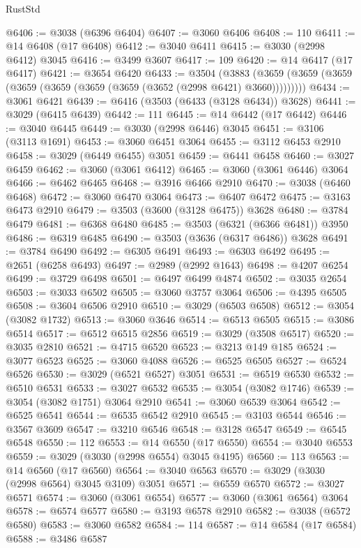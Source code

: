 \begin{lexlean}{RustStd}
\begin{coremodule}
@6406 := @3038 (@6396 @6404)
@6407 := @3060 @6406
@6408 := 110
@6411 := @14 @6408 (@17 @6408)
@6412 := @3040 @6411
@6415 := @3030 (@2998 @6412) @3045
@6416 := @3499 @3607
@6417 := 109
@6420 := @14 @6417 (@17 @6417)
@6421 := @3654 @6420
@6433 := @3504
    (@3883 (@3659 (@3659 (@3659 (@3659 (@3659 (@3659 (@3659 (@3652 (@2998 @6421) @3660)))))))))
@6434 := @3061 @6421
@6439 := @6416 (@3503 (@6433 (@3128 @6434)) @3628)
@6441 := @3029 (@6415 @6439)
@6442 := 111
@6445 := @14 @6442 (@17 @6442)
@6446 := @3040 @6445
@6449 := @3030 (@2998 @6446) @3045
@6451 := @3106 (@3113 @1691)
@6453 := @3060 @6451 @3064
@6455 := @3112 @6453 @2910
@6458 := @3029 (@6449 @6455) @3051
@6459 := @6441 @6458
@6460 := @3027 @6459
@6462 := @3060 (@3061 @6412)
@6465 := @3060 (@3061 @6446) @3064
@6466 := @6462 @6465
@6468 := @3916 @6466 @2910
@6470 := @3038 (@6460 @6468)
@6472 := @3060 @6470 @3064
@6473 := @6407 @6472
@6475 := @3163 @6473 @2910
@6479 := @3503 (@3600 (@3128 @6475)) @3628
@6480 := @3784 @6479
@6481 := @6368 @6480
@6485 := @3503 (@6321 (@6366 @6481)) @3950
@6486 := @6319 @6485
@6490 := @3503 (@3636 (@6317 @6486)) @3628
@6491 := @3784 @6490
@6492 := @6305 @6491
@6493 := @6303 @6492
@6495 := @2651 (@6258 @6493)
@6497 := @2989 (@2992 @1643)
@6498 := @4207 @6254
@6499 := @3729 @6498
@6501 := @6497 @6499 @4874
@6502 := @3035 @2654
@6503 := @3033 @6502
@6505 := @3060 @3757 @3064
@6506 := @4395 @6505
@6508 := @3604 @6506 @2910
@6510 := @3029 (@6503 @6508)
@6512 := @3054 (@3082 @1732)
@6513 := @3060 @3646
@6514 := @6513 @6505
@6515 := @3086 @6514
@6517 := @6512 @6515 @2856
@6519 := @3029 (@3508 @6517)
@6520 := @3035 @2810
@6521 := @4715 @6520
@6523 := @3213 @149 @185
@6524 := @3077 @6523
@6525 := @3060 @4088
@6526 := @6525 @6505
@6527 := @6524 @6526
@6530 := @3029 (@6521 @6527) @3051
@6531 := @6519 @6530
@6532 := @6510 @6531
@6533 := @3027 @6532
@6535 := @3054 (@3082 @1746)
@6539 := @3054 (@3082 @1751) @3064 @2910
@6541 := @3060 @6539 @3064
@6542 := @6525 @6541
@6544 := @6535 @6542 @2910
@6545 := @3103 @6544
@6546 := @3567 @3609
@6547 := @3210 @6546
@6548 := @3128 @6547
@6549 := @6545 @6548
@6550 := 112
@6553 := @14 @6550 (@17 @6550)
@6554 := @3040 @6553
@6559 := @3029 (@3030 (@2998 @6554) @3045 @4195)
@6560 := 113
@6563 := @14 @6560 (@17 @6560)
@6564 := @3040 @6563
@6570 := @3029 (@3030 (@2998 @6564) @3045 @3109) @3051
@6571 := @6559 @6570
@6572 := @3027 @6571
@6574 := @3060 (@3061 @6554)
@6577 := @3060 (@3061 @6564) @3064
@6578 := @6574 @6577
@6580 := @3193 @6578 @2910
@6582 := @3038 (@6572 @6580)
@6583 := @3060 @6582
@6584 := 114
@6587 := @14 @6584 (@17 @6584)
@6588 := @3486 @6587

\end{coremodule}
\end{lexlean}
